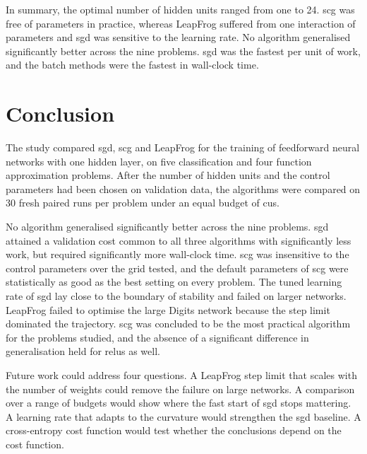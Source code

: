 \documentclass[conference]{IEEEtran}
\begin{document}
In summary, the optimal number of hidden units ranged from one to 24. \Gls{scg} was free of parameters in practice, whereas LeapFrog suffered from one
interaction of parameters and \gls{sgd} was sensitive to the learning rate. No algorithm
generalised significantly better across the nine problems. \Gls{sgd} was the
fastest per unit of work, and the batch methods were the fastest in wall-clock
time.

\glsresetall

\section{Conclusion}

The study compared \gls{sgd}, \gls{scg} and LeapFrog for the training of feedforward
neural networks with one hidden layer, on five classification and four function
approximation problems. After the number of hidden units and the control
parameters had been chosen on validation data, the algorithms were compared on 30
fresh paired runs per problem under an equal budget of \glspl{cu}.

No algorithm generalised significantly better across the nine problems.
\Gls{sgd} attained a validation cost common to all three algorithms with
significantly less work, but required
significantly more wall-clock time. \Gls{scg} was insensitive to the control parameters over the grid tested, and
the default parameters of \gls{scg} were statistically as good as the best
setting on every problem. The tuned learning rate of \gls{sgd} lay close
to the boundary of stability and failed on larger networks. LeapFrog failed to
optimise the large Digits network because the step limit dominated the
trajectory. \Gls{scg} was concluded to be the most
practical algorithm for the problems studied, and the absence of a significant
difference in generalisation held for \glspl{relu} as well.

Future work could address four questions. A LeapFrog step limit that scales with
the number of weights could remove the failure on large networks. A comparison over a
range of budgets would show where the fast start of \gls{sgd} stops mattering. A
learning rate that adapts to the curvature would strengthen the \gls{sgd} baseline.
A cross-entropy cost function would test whether the conclusions depend on the cost
function.



\end{document}
